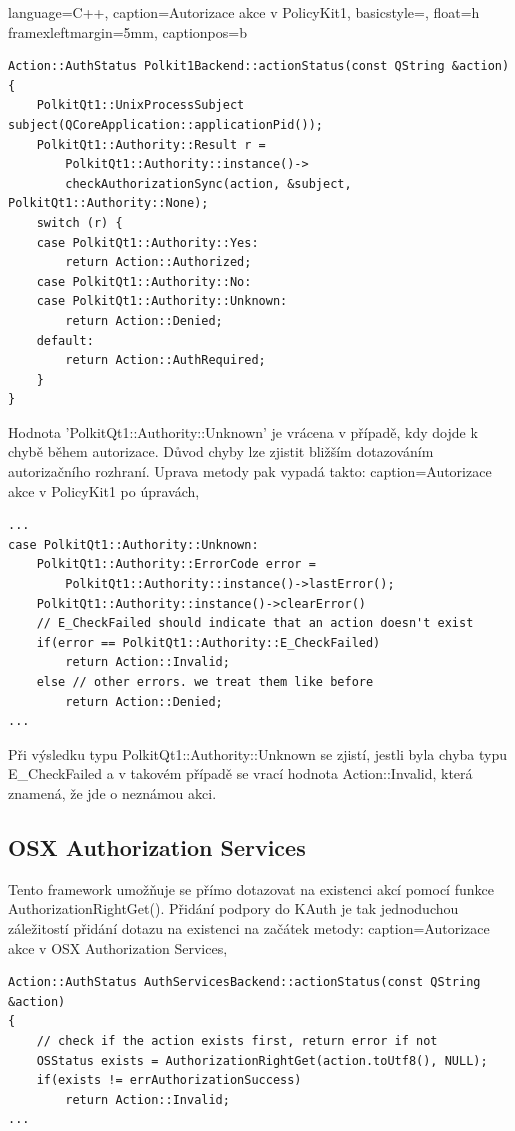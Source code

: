 \renewcommand*\lstlistingname{Výpis}
\lstset
{
    language=C++,
    caption=Autorizace akce v PolicyKit1,
    basicstyle=\footnotesize,
    float=h
    framexleftmargin=5mm,
    captionpos=b
}
\begin{lstlisting}
Action::AuthStatus Polkit1Backend::actionStatus(const QString &action)
{
    PolkitQt1::UnixProcessSubject subject(QCoreApplication::applicationPid());
    PolkitQt1::Authority::Result r =
        PolkitQt1::Authority::instance()->
        checkAuthorizationSync(action, &subject, PolkitQt1::Authority::None);
    switch (r) {
    case PolkitQt1::Authority::Yes:
        return Action::Authorized;
    case PolkitQt1::Authority::No:
    case PolkitQt1::Authority::Unknown:
        return Action::Denied;
    default:
        return Action::AuthRequired;
    }
}
\end{lstlisting}
Hodnota 'PolkitQt1::Authority::Unknown' je vrácena v případě, kdy dojde k chybě
během autorizace. Důvod chyby lze zjistit bližším dotazováním autorizačního
rozhraní. Uprava metody pak vypadá takto:
\lstset
{
    caption=Autorizace akce v PolicyKit1 po úpravách,
}
\begin{lstlisting}
...
case PolkitQt1::Authority::Unknown:
    PolkitQt1::Authority::ErrorCode error =
        PolkitQt1::Authority::instance()->lastError();
    PolkitQt1::Authority::instance()->clearError()
    // E_CheckFailed should indicate that an action doesn't exist
    if(error == PolkitQt1::Authority::E_CheckFailed)
        return Action::Invalid;
    else // other errors. we treat them like before
        return Action::Denied;
...
\end{lstlisting}

Při výsledku typu PolkitQt1::Authority::Unknown se zjistí, jestli byla chyba
typu E\_CheckFailed a v takovém případě se vrací hodnota Action::Invalid,
která znamená, že jde o neznámou akci.
\subsection{OSX Authorization Services}
Tento framework umožňuje se přímo dotazovat na existenci akcí pomocí funkce
AuthorizationRightGet(). Přidání podpory do KAuth je tak jednoduchou záležitostí
přidání dotazu na existenci na začátek metody:
\lstset
{
    caption=Autorizace akce v OSX Authorization Services,
}
\begin{lstlisting}
Action::AuthStatus AuthServicesBackend::actionStatus(const QString &action)
{
    // check if the action exists first, return error if not
    OSStatus exists = AuthorizationRightGet(action.toUtf8(), NULL);
    if(exists != errAuthorizationSuccess)
        return Action::Invalid;
...
\end{lstlisting}

